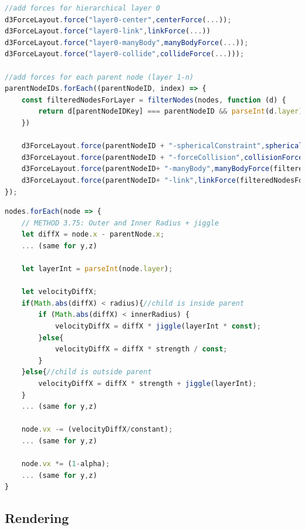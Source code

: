 \begin{lstlisting}[language=JavaScript,label={lst:addForces},caption=Simplified algorithm that shows which forces are added to the simulation.] 
//add forces for hierarchical layer 0
d3ForceLayout.force("layer0-center",centerForce(...));
d3ForceLayout.force("layer0-link",linkForce(...))
d3ForceLayout.force("layer0-manyBody",manyBodyForce(...));
d3ForceLayout.force("layer0-collide",collideForce(...)));

//add forces for each parent node (layer 1-n)
parentNodeIDs.forEach((parentNodeID, index) => {
    const filteredNodesForLayer = filterNodes(nodes, function (d) {
        return d[parentNodeIDKey] === parentNodeID && parseInt(d.layer) === childLayer;
    })

    d3ForceLayout.force(parentNodeID + "-sphericalConstraint",sphericalConstraint(filteredNodesForLayer,...));
    d3ForceLayout.force(parentNodeID + "-forceCollision",collisionForce(filteredNodesForLayer,...));
    d3ForceLayout.force(parentNodeID+ "-manyBody",manyBodyForce(filteredNodesForLayer,...));
    d3ForceLayout.force(parentNodeID+ "-link",linkForce(filteredNodesForLayer,...));
});
\end{lstlisting}
\begin{lstlisting}[language=JavaScript,label={lst:sphericalConstraint},caption=Simplified algorithm for the spherical constraint. We apply adapted velocities whenether the child node is inside the parent. In addition we further seperate if the childnode is already inside an closer radius or not.] 
nodes.forEach(node => {
    // METHOD 3.75: Outer and Inner Radius + jiggle
    let diffX = node.x - parentNode.x;
    ... (same for y,z)

    let layerInt = parseInt(node.layer);

    let velocityDiffX;
    if(Math.abs(diffX) < radius){//child is inside parent
        if (Math.abs(diffX) < innerRadius) {
            velocityDiffX = diffX * jiggle(layerInt * const);
        }else{
            velocityDiffX = diffX * strength / const;
        } 
    }else{//child is outside parent
        velocityDiffX = diffX * strength + jiggle(layerInt);
    }
    ... (same for y,z)

    node.vx -= (velocityDiffX/constant);
    ... (same for y,z)

    node.vx *= (1-alpha);
    ... (same for y,z)
}
\end{lstlisting}

\subsection{Rendering}
\label{sec:rendering}

